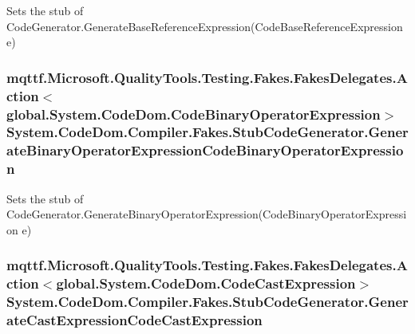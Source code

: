 Sets the stub of Code\-Generator.\-Generate\-Base\-Reference\-Expression(\-Code\-Base\-Reference\-Expression e)

\hypertarget{class_system_1_1_code_dom_1_1_compiler_1_1_fakes_1_1_stub_code_generator_af4bb057662563c21c15f19b8663e2e23}{
\subsubsection[{Generate\-Binary\-Operator\-Expression\-Code\-Binary\-Operator\-Expression}]{\setlength{\rightskip}{0pt plus 5cm}mqttf.\-Microsoft.\-Quality\-Tools.\-Testing.\-Fakes.\-Fakes\-Delegates.\-Action$<$global.\-System.\-Code\-Dom.\-Code\-Binary\-Operator\-Expression$>$ System.\-Code\-Dom.\-Compiler.\-Fakes.\-Stub\-Code\-Generator.\-Generate\-Binary\-Operator\-Expression\-Code\-Binary\-Operator\-Expression}}\label{class_system_1_1_code_dom_1_1_compiler_1_1_fakes_1_1_stub_code_generator_af4bb057662563c21c15f19b8663e2e23}


Sets the stub of Code\-Generator.\-Generate\-Binary\-Operator\-Expression(\-Code\-Binary\-Operator\-Expression e)

\hypertarget{class_system_1_1_code_dom_1_1_compiler_1_1_fakes_1_1_stub_code_generator_aeb36a8bc87f093d4620ff37c8cff5a4f}{
\subsubsection[{Generate\-Cast\-Expression\-Code\-Cast\-Expression}]{\setlength{\rightskip}{0pt plus 5cm}mqttf.\-Microsoft.\-Quality\-Tools.\-Testing.\-Fakes.\-Fakes\-Delegates.\-Action$<$global.\-System.\-Code\-Dom.\-Code\-Cast\-Expression$>$ System.\-Code\-Dom.\-Compiler.\-Fakes.\-Stub\-Code\-Generator.\-Generate\-Cast\-Expression\-Code\-Cast\-Expression}}\label{class_system_1_1_code_dom_1_1_compiler_1_1_fakes_1_1_stub_code_generator_aeb36a8bc87f093d4620ff37c8cff5a4f}


